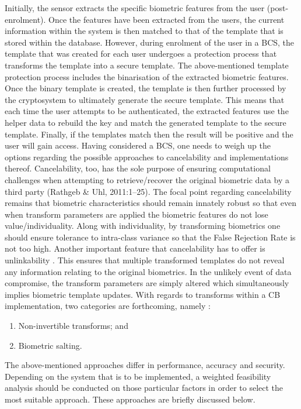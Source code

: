 Initially, the sensor extracts the specific biometric features from the user (post-enrolment). Once the features have been extracted from the users, the current information within the system is then matched to that of the template that is stored within the database. However, during enrolment of the user in a BCS, the template that was created for each user undergoes a protection process that transforms the template into a secure template. The above-mentioned template protection process includes the binarisation of the extracted biometric features. Once the binary template is created, the template is then further processed by the cryptosystem to ultimately generate the secure template. This means that each time the user attempts to be authenticated, the extracted features use the helper data to rebuild the key and match the generated template to the secure template. Finally, if the templates match then the result will be positive and the user will gain access. 
Having considered a BCS, one needs to weigh up the options regarding the possible approaches to cancelability and implementations thereof. Cancelability, too, has the sole purpose of ensuring computational challenges when attempting to retrieve/recover the original biometric data by a third party (Rathgeb \& Uhl, 2011:1–25). The focal point regarding cancelability remains that biometric characteristics should remain innately robust so that even when transform parameters are applied the biometric features do not lose value/individuality. Along with individuality, by transforming biometrics one should ensure tolerance to intra-class variance so that the False Rejection Rate is not too high. Another important feature that cancelability has to offer is unlinkability \citep{Rathgeb2011}. This ensures that multiple transformed templates do not reveal any information relating to the original biometrics. In the unlikely event of data compromise, the transform parameters are simply altered which simultaneously implies biometric template updates. 
With regards to transforms within a CB implementation, two categories are forthcoming, namely \citep{Jain2016}:
  

\begin{enumerate}[label=\roman*.]
	\item Non-invertible transforms; and
	\item Biometric salting.
\end{enumerate}

The above-mentioned approaches differ in performance, accuracy and security. Depending on the system that is to be implemented, a weighted feasibility analysis should be conducted on those particular factors in order to select the most suitable approach. These approaches are briefly discussed below.

